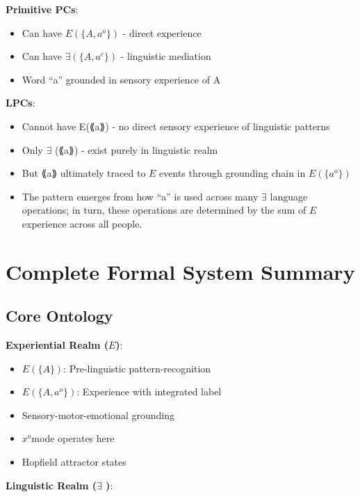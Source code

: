 \documentclass[12pt]{article}
\providecommand{\tightlist}{}   %
\begin{document}
\textbf{Primitive PCs}:

\begin{itemize}
\tightlist
\item
  Can have \(E(\{A, a^o\})\) - direct experience
\item
  Can have \(\exists(\{A, a^c\})\) - linguistic mediation
\item
  Word ``a'' grounded in sensory experience of A
\end{itemize}

\textbf{LPCs}:

\begin{itemize}
\tightlist
\item
  Cannot have E(⟪a⟫) - no direct sensory experience of linguistic patterns
\item
  Only \(\exists\) (⟪a⟫) - exist purely in linguistic realm
\item
  But ⟪a⟫ ultimately traced to \(E\) events through grounding chain in \(E(\{a^o\})\)
\item
  The pattern emerges from how ``a'' is used across many \(\exists\) language operations; in turn, these operations are determined by the sum of \(E\) experience across all people.
\end{itemize}

\section{Complete Formal System Summary}\label{complete-formal-system-summary}

\subsection{Core Ontology}\label{core-ontology}

\textbf{Experiential Realm (\(E\))}:

\begin{itemize}
\tightlist
\item
  \(E(\{A\})\): Pre-linguistic pattern-recognition
\item
  \(E(\{A, a^o\})\): Experience with integrated label
\item
  Sensory-motor-emotional grounding
\item
  \(x^o\)mode operates here
\item
  Hopfield attractor states
\end{itemize}

\textbf{Linguistic Realm (\(\exists\) )}:
\end{document}
